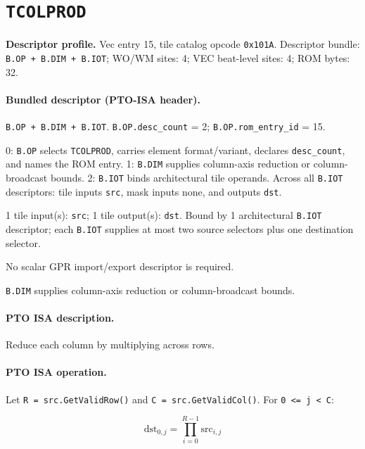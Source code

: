 \section{\texttt{TCOLPROD}}
\noindent\textbf{Descriptor profile.} Vec entry 15, tile catalog opcode \texttt{0x101A}. Descriptor bundle: \texttt{B.OP + B.DIM + B.IOT}; WO/WM sites: 4; VEC beat-level sites: 4; ROM bytes: 32.\par\smallskip
{}
\paragraph{Bundled descriptor (PTO-ISA header).}
\begin{description}[leftmargin=0.18\linewidth,style=nextline]
\item[Bundle] \texttt{B.OP + B.DIM + B.IOT}. \texttt{B.OP.desc\_count} = 2; \texttt{B.OP.rom\_entry\_id} = 15.
\item[Assembly] 0: \texttt{B.OP} selects \texttt{TCOLPROD}, carries element format/variant, declares \texttt{desc\_count}, and names the ROM entry. 1: \texttt{B.DIM} supplies column-axis reduction or column-broadcast bounds. 2: \texttt{B.IOT} binds architectural tile operands. Across all \texttt{B.IOT} descriptors: tile inputs \texttt{src}, mask inputs none, and outputs \texttt{dst}.
\item[Tile operands] 1 tile input(s): \texttt{src}; 1 tile output(s): \texttt{dst}. Bound by 1 architectural \texttt{B.IOT} descriptor; each \texttt{B.IOT} supplies at most two source selectors plus one destination selector.
\item[Scalar GPR operands] No scalar GPR import/export descriptor is required.
\item[Metadata operands] \texttt{B.DIM} supplies column-axis reduction or column-broadcast bounds.
\end{description}
\par\smallskip
{\small
\paragraph{PTO ISA description.}
Reduce each column by multiplying across rows.
\paragraph{PTO ISA operation.}
Let \texttt{R = src.GetValidRow()} and \texttt{C = src.GetValidCol()}. For \texttt{0 \textless{}= j \textless{} C}:

\[
\mathrm{dst}_{0,j} = \prod_{i=0}^{R-1} \mathrm{src}_{i,j}
\]
}\par\smallskip
